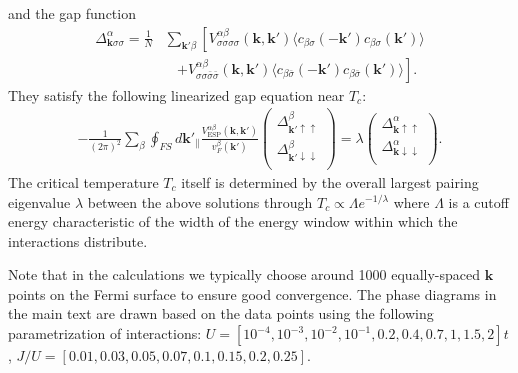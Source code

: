 \documentclass[aps,prl,twocolumn,superscriptaddress,showpacs]{revtex4-1}
\newcommand{\bs}{\boldsymbol}
\begin{document}
and the gap function
\begin{align}
\Delta^{\alpha}_{\bm{k}\sigma\sigma}=\frac{1}{N}
&\sum_{\bm{k}'\beta}\left[V^{\alpha\beta}
_{\sigma\sigma\sigma\sigma}(\bm{k},\bm{k}')
\Big\langle c_{\beta\sigma}(-\bm{k}')
c_{\beta\sigma}(\bm{k}')\Big\rangle\right.                         \nonumber\\
&~~~~\left.+V^{\alpha\beta}
_{\sigma\sigma\bar{\sigma}\bar{\sigma}}(\bm{k},\bm{k}')
\Big\langle c_{\beta\bar{\sigma}}(-\bm{k}')
c_{\beta\bar{\sigma}}(\bm{k}')\Big\rangle\right].
\end{align}
They satisfy the following linearized gap equation near $T_c$:
\begin{align}
-\frac{1}{(2\pi)^2}\sum_{\beta}\oint_{FS}d\bm{k}'_{\parallel}
\frac{V^{\alpha\beta}_\text{ESP}(\bm{k},\bm{k}')}{v^{\beta}_F(\bm{k}')}\left(
\begin{array}{c}
\Delta^{\beta}_{\bm{k}'\uparrow\uparrow} \\
\Delta^{\beta}_{\bm{k}'\downarrow\downarrow} \\
\end{array}
\right)
=\lambda\left(
\begin{array}{c}
\Delta^{\alpha}_{\bm{k}\uparrow\uparrow} \\
\Delta^{\alpha}_{\bm{k}\downarrow\downarrow} \\
\end{array}
\right).
\end{align}
The critical temperature $T_c$ itself is determined by the overall largest pairing eigenvalue $\lambda$ between the above solutions through $T_c\propto \Lambda e^{-1/\lambda}$ where $\Lambda$ is a cutoff energy characteristic of the width of the energy window within which the interactions distribute.

Note that in the calculations we typically choose around 1000 equally-spaced $\bs k$ points on the Fermi surface to ensure good convergence. The phase diagrams in the main text are drawn based on the data points using the following parametrization of interactions: $U=[10^{-4},10^{-3},10^{-2},10^{-1},0.2,0.4,0.7,1,1.5,2]t$, $J/U=[0.01,0.03,0.05,0.07,0.1,0.15,0.2,0.25]$.
\end{document}
